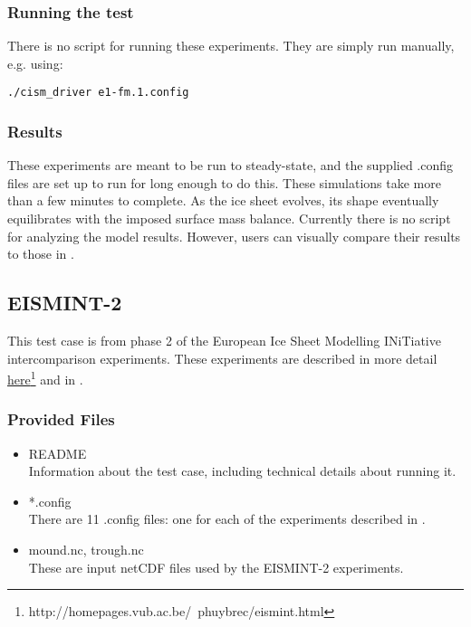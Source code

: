 \subsubsection{Running the test}
There is no script for running these experiments. They are simply run manually, e.g. using: 

\texttt{./cism\_driver e1-fm.1.config}

\subsubsection{Results}
\label{subsecc:eismint_results}
These experiments are meant to be run to steady-state, and the supplied .config files are set up to run for long enough to do this.
These simulations take more than a few minutes to complete.
As the ice sheet evolves, its shape eventually equilibrates with the imposed surface mass balance.  
Currently there is no script for analyzing the model results.  
However, users can visually compare their results to those in \citet{Huybrechts1996}.


\subsection{EISMINT-2}
\label{sec:eismint2_description}
This test case is from phase 2 of the European Ice Sheet Modelling INiTiative intercomparison experiments.  These experiments are described in more detail
\href{http://homepages.vub.ac.be/~phuybrec/eismint.html}{here}\footnote{http://homepages.vub.ac.be/~phuybrec/eismint.html} and in \citet{Payne2000}.

\subsubsection{Provided Files}
\label{subsec:eismint2_files}

\begin{itemize}
	\item README \\
	Information about the test case, including technical details about running it.
  	\item *.config \\
  	There are 11 .config files: one for each of the experiments described in \citet{Payne2000}.
  	\item mound.nc, trough.nc \\
    	These are input netCDF files used by the EISMINT-2 experiments.
\end{itemize}


